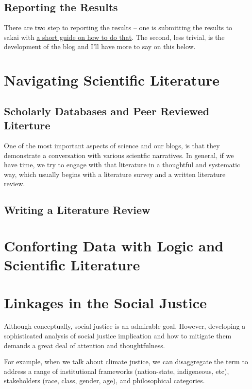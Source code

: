 \documentclass{tufte-handout}\usepackage[]{graphicx}\usepackage[]{color}
\begin{document}
\subsection{Reporting the Results}

There are two step to reporting the results -- one is submitting the results to sakai with \href{https://github.com/marclos/Climate_Change_Narratives/blob/master/Admin/Deliverables/Exporting_Files.pdf}{a short guide on how to do that}. The second, less trivial, is the development of the blog and I'll have more to say on this below.


\section{Navigating Scientific Literature}

\subsection{Scholarly Databases and Peer Reviewed Literture}

One of the most important aspects of science and our blogs, is that they demonstrate a conversation with various scientfic narratives. In general, if we have time, we try to engage with that literature in a thoughtful and systematic way, which usually begins with a literature survey and a written literature review. 

\subsection{Writing a Literature Review}

\section{Conforting Data with Logic and Scientific Literature}

\section{Linkages in the Social Justice}

Although conceptually, social justice is an admirable goal. However, developing a sophisticated analysis of social justice implication and how to mitigate them demands a great deal of attention and thoughtfulness. 

For example, when we talk about climate justice, we can disaggregate the term to address a range of institutional frameworks (nation-state, indigeneous, etc), stakeholders (race, class, gender, age), and philosophical categories. 
\end{document}
